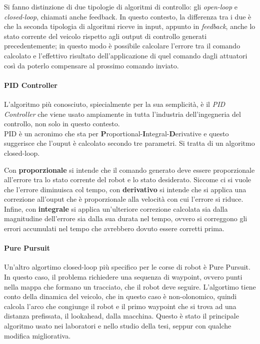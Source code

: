 Si fanno distinzione di due tipologie di algoritmi di controllo: gli \textit{open-loop} e
\textit{closed-loop}, chiamati anche feedback. In questo contesto, la differenza tra i due è che la
seconda tipologia di algoritmi riceve in input, appunto in \textit{feedback}, anche lo stato corrente del
veicolo rispetto agli output di controllo generati precedentemente; in questo modo è possibile calcolare
l'errore tra il comando calcolato e l'effettivo risultato dell'applicazione di quel comando dagli
attuatori così da poterlo compensare al prossimo comando inviato.

\paragraph{PID Controller}
L'algoritmo più conosciuto, spiecialmente per la sua semplicità, è il \textit{PID Controller} che viene
usato ampiamente in tutta l'industria dell'ingegneria del controllo, non solo in questo contesto.\\
PID è un acronimo che sta per \textbf{P}roportional-\textbf{I}ntegral-\textbf{D}erivative e questo
suggerisce che l'ouput è calcolato secondo tre parametri. Si tratta di un algoritmo closed-loop.

Con \textbf{proporzionale} si intende che il comando generato deve essere proporzionale all'errore tra lo
stato corrente del robot e lo stato desiderato.
Siccome ci si vuole che l'errore diminuisca col tempo, con \textbf{derivativo} si intende che si applica
una correzione all'ouput che è proporzionale alla velocità con cui l’errore si riduce.
Infine, con \textbf{integrale} si applica un'ulteriore correzione calcolata sia dalla magnitudine
dell'errore sia dalla sua durata nel tempo, ovvero si correggono gli errori accumulati nel tempo che
avrebbero dovuto essere corretti prima.

\paragraph{Pure Pursuit}
Un'altro algortimo closed-loop più specifico per le corse di robot è Pure Pursuit. In questo caso, il
problema richiedere una sequenza di waypoint, ovvero punti nella mappa che formano un tracciato, che il
robot deve seguire. L'algortimo tiene conto della dinamica del veicolo, che in questo caso è
non-olonomico, quindi calcola l'arco che congiunge il robot e il primo waypoint che si trova ad una
distanza prefissata, il lookahead, dalla macchina.
Questo è stato il principale algoritmo usato nei laboratori e nello studio della tesi, seppur con qualche
modifica migliorativa.



